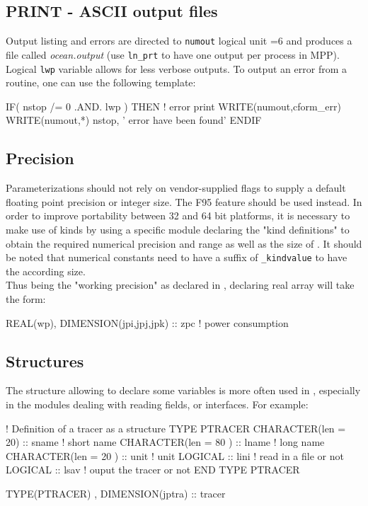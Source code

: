 \subsection{PRINT - ASCII output files}

Output listing and errors are directed to \texttt{numout} logical unit =6 and
produces a file called \textit{ocean.output} (use \texttt{ln\_prt} to have one output per process in MPP).
Logical \texttt{lwp} variable allows for less verbose outputs.
To output an error from a routine, one can use the following template:

\begin{forlines}
IF( nstop /= 0 .AND. lwp ) THEN   ! error print
   WRITE(numout,cform_err)
   WRITE(numout,*) nstop, ' error have been found'
ENDIF
\end{forlines}

\subsection{Precision}

Parameterizations should not rely on vendor-supplied flags to supply a default floating point precision or
integer size.
The F95  feature should be used instead.
In order to improve portability between 32 and 64 bit platforms,
it is necessary to make use of kinds by using a specific module 
declaring the "kind definitions" to obtain the required numerical precision and range as well as
the size of .
It should be noted that numerical constants need to have a suffix of \texttt{\_kindvalue} to
have the according size. \\
Thus  being the "working precision" as declared in ,
declaring real array  will take the form:

\begin{forlines}
REAL(wp), DIMENSION(jpi,jpj,jpk) ::  zpc      ! power consumption
\end{forlines}

\subsection{Structures}

The  structure allowing to declare some variables is more often used in \NEMO,
especially in the modules dealing with reading fields, or interfaces.
For example:

\begin{forlines}
! Definition of a tracer as a structure
TYPE PTRACER
   CHARACTER(len = 20)  :: sname  ! short name
   CHARACTER(len = 80 ) :: lname  ! long name
   CHARACTER(len = 20 ) :: unit   ! unit
   LOGICAL              :: lini   ! read in a file or not
   LOGICAL              :: lsav   ! ouput the tracer or not
END TYPE PTRACER

TYPE(PTRACER) , DIMENSION(jptra) :: tracer
\end{forlines}

